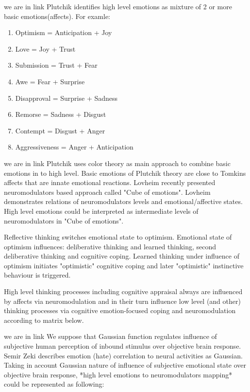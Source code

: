 we are in link
Plutchik identifies high level emotions \cite{natureofemotions} as mixture of 2 or more basic emotions(affects). For examle:

\begin{enumerate}
\item  Optimism =	Anticipation + Joy
\item  Love =	Joy + Trust
\item  Submission = Trust + Fear
\item  Awe = Fear + Surprise
\item  Disapproval = Surprise + Sadness
\item  Remorse = Sadness + Disgust
\item  Contempt = Disgust + Anger
\item  Aggressiveness =	Anger + Anticipation
\end{enumerate}

we are in link
Plutchik uses color theory as main approach to combine basic emotions in to high level. Basic emotions of Plutchik theory are close to Tomkins affects that are innate emotional reactions. Lovheim recently presented neuromodulators based approach called "Cube of emotions"\cite{cubeofemotions}. Lovheim demonstrates relations of neuromodulators levels and emotional/affective states. High level emotions could be interpreted as intermediate levels of neuromodulators in "Cube of emotions"\cite{cubeofemotions}.



Reflective thinking switches emotional state to optimism. Emotional state of optimism influences: deliberative thinking and learned thinking, second deliberative thinking and cognitive coping. Learned thinking under influence of optimism initiates "optimistic" cognitive coping and later "optimistic" instinctive behaviour is triggered.

High level thinking processes including cognitive appraisal always are influenced by affects via neuromodulation and in their turn influence low level (and other) thinking processes via cognitive emotion-focused coping and neuromodulation according to matrix below.

we are in link
We suppose that Gaussian function regulates influence of subjective human perception of inbound stimulus over objective brain response. Semir Zeki \cite{neuralcorrelatesofhate} describes emotion (hate) correlation to neural activities as Gaussian. Taking in account Gaussian nature of influence of subjective emotional state over objective brain response, *high level emotions to neuromodulators mapping* could be represented as following:

